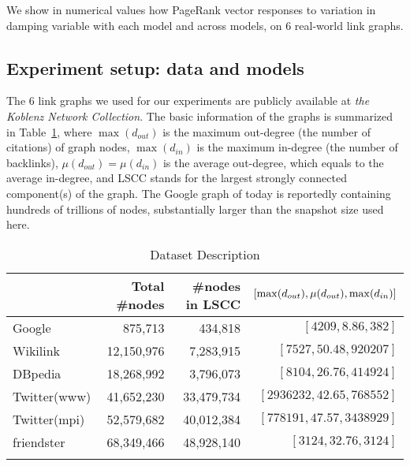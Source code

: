 \documentclass[conference]{IEEEtran}
\let\leftorig\left
\let\rightorig\right
\renewcommand{\left}{\mathopen{}\mathclose\bgroup\leftorig}
\renewcommand{\right}{\aftergroup\egroup\rightorig}
\begin{document}
We show in numerical values how PageRank vector responses to variation
in damping variable with each model and across models, on $6$ real-world
link graphs.
%

\subsection{Experiment setup: data and models}
\label{subsec:data-and-models} 
%


The $6$ link graphs we used for our experiments are publicly available
at {\em the Koblenz Network Collection}\cite{kunegis2013konect}. 
The basic information of the graphs is summarized in
Table~\ref{tab:dataset}, where $\max(d_{out})$ is the maximum out-degree
(the number of citations) of graph nodes, $\max(d_{in})$ is the maximum 
in-degree (the number of backlinks), $\mu(d_{out}) = \mu(d_{in})$ is
the average out-degree, which equals to the average in-degree, 
and LSCC stands for the largest strongly connected component(s) of the graph. 
The Google graph of today is reportedly containing hundreds of trillions 
of nodes, substantially larger than the snapshot size used here.
%
% 

\begin{table}[H]
\centering
\caption{Dataset Description}
\label{tab:dataset}
\begin{adjustbox}{width=0.5\textwidth}
\begin{tabular}[t]{lrrr}
\toprule
&  Total \#nodes & \#nodes in LSCC & $\left[\max(d_{out}), \mu(d_{out}), \max(d_{in})\right]$\\
\midrule
   Google \cite{google-net} & 875,713 & 434,818 & $[ 4209, 8.86, 382]$ 
\\ 
Wikilink \cite{kunegis2013konect} & 12,150,976 & 7,283,915 & $[7527, 50.48, 920207]$ 
\\
DBpedia \cite{auer2007dbpedia} & 18,268,992 & 3,796,073 & $[8104, 26.76, 414924]$ 
\\
Twitter(www)\cite{Kwak10www} & 41,652,230 & 33,479,734 & $[2936232, 42.65, 768552]$  
\\
Twitter(mpi)\cite{icwsm10cha} & 52,579,682 & 40,012,384 & $[778191, 47.57, 3438929]$
\\
friendster\cite{yang2015defining} & 68,349,466 & 48,928,140 & $[3124, 32.76, 3124]$  
\\ 
\bottomrule{}
\end{tabular}
\end{adjustbox}
\end{table}
\end{document}
